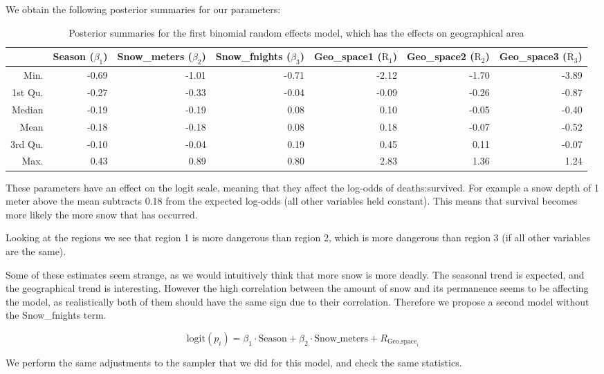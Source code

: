 \documentclass[10pt]{extarticle}
\begin{document}
We obtain the following posterior summaries for our parameters:

\begin{table}[ht]
	\centering
	\footnotesize
	\begin{tabular}{r|rrrrrr}
		\hline
		& Season ($\beta_1$) & Snow\_meters ($\beta_2$) & Snow\_fnights ($\beta_3$) & Geo\_space1 ($\mathrm{R}_{1}$) & Geo\_space2 ($\mathrm{R}_{2}$) & Geo\_space3 ($\mathrm{R}_{3}$)\\ 
		\hline
		Min. & -0.69 & -1.01 & -0.71 & -2.12 & -1.70 & -3.89 \\ 
		1st Qu. & -0.27 & -0.33 & -0.04 & -0.09 & -0.26 & -0.87 \\ 
		Median & -0.19 & -0.19 & 0.08 & 0.10 & -0.05 & -0.40 \\ 
		Mean & -0.18 & -0.18 & 0.08 & 0.18 & -0.07 & -0.52 \\ 
		3rd Qu. & -0.10 & -0.04 & 0.19 & 0.45 & 0.11 & -0.07 \\ 
		Max. & 0.43 & 0.89 & 0.80 & 2.83 & 1.36 & 1.24 \\ 
		\hline
	\end{tabular}
\caption{Posterior summaries for the first binomial random effects model, which has the effects on geographical area}
\label{tab:postsum_binmod1}
\end{table}

These parameters have an effect on the logit scale, meaning that they affect the log-odds of deaths:survived. For example a snow depth of 1 meter above the mean subtracts 0.18 from the expected log-odds (all other variables held constant). This means that survival becomes more likely the more snow that has occurred. 

Looking at the regions we see that region 1 is more dangerous than region 2, which is more dangerous than region 3 (if all other variables are the same). 

Some of these estimates seem strange, as we would intuitively think that more snow is more deadly. The seasonal trend is expected, and the geographical trend is interesting. However the high correlation between the amount of snow and its permanence seems to be affecting the model, as realistically both of them should have the same sign due to their correlation. Therefore we propose a second model without the Snow\_fnights term.

\[
\mathrm{logit}(p_i) = \beta_1 \cdot \mathrm{Season} + \beta_2 \cdot \mathrm{Snow\_meters} + R_{\mathrm{Geo.space}_i}
\]

We perform the same adjustments to the sampler that we did for this model, and check the same statistics.
\end{document}
